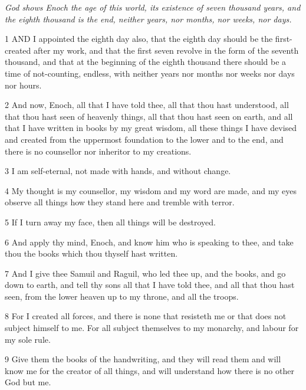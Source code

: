\par \textit{God shows Enoch the age of this world, its existence of seven thousand years, and the eighth thousand is the end, neither years, nor months, nor weeks, nor days.}

\par 1 AND I appointed the eighth day also, that the eighth day should be the first-created after my work, and that the first seven revolve in the form of the seventh thousand, and that at the beginning of the eighth thousand there should be a time of not-counting, endless, with neither years nor months nor weeks nor days nor hours.

\par 2 And now, Enoch, all that I have told thee, all that thou hast understood, all that thou hast seen of heavenly things, all that thou hast seen on earth, and all that I have written in books by my great wisdom, all these things I have devised and created from the uppermost foundation to the lower and to the end, and there is no counsellor nor inheritor to my creations.

\par 3 I am self-eternal, not made with hands, and without change.

\par 4 My thought is my counsellor, my wisdom and my word are made, and my eyes observe all things how they stand here and tremble with terror.

\par 5 If I turn away my face, then all things will be destroyed.

\par 6 And apply thy mind, Enoch, and know him who is speaking to thee, and take thou the books which thou thyself hast written.

\par 7 And I give thee Samuil and Raguil, who led thee up, and the books, and go down to earth, and tell thy sons all that I have told thee, and all that thou hast seen, from the lower heaven up to my throne, and all the troops.

\par 8 For I created all forces, and there is none that resisteth me or that does not subject himself to me. For all subject themselves to my monarchy, and labour for my sole rule.

\par 9 Give them the books of the handwriting, and they will read them and will know me for the creator of all things, and will understand how there is no other God but me.

